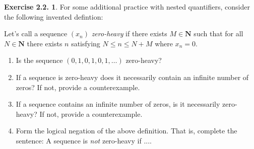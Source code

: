 \documentclass[12pt]{article}
\theoremstyle{definition}
\theoremstyle{exercise}
\newtheorem{exercise}{Exercise 2.2.}
\theoremstyle{solution}
\newcommand{\N}{\mathbf{N}}
\begin{document}
\begin{exercise}
\label{ex:8}
    For some additional practice with nested quantifiers, consider the following invented defintion:

    Let's call a sequence \( (x_n) \) \textit{zero-heavy} if there exists \( M \in \N \) such that for all \( N \in \N \) there exists \( n \) satisfying \( N \leq n \leq N + M \) where \( x_n = 0 \).
    \begin{enumerate}
        \item Is the sequence \( (0, 1, 0, 1, 0, 1, \ldots) \) zero-heavy?

        \item If a sequence is zero-heavy does it necessarily contain an infinite number of zeros? If not, provide a counterexample.

        \item If a sequence contains an infinite number of zeros, is it necessarily zero-heavy? If not, provide a counterexample.

        \item Form the logical negation of the above definition. That is, complete the sentence: A sequence is \textit{not} zero-heavy if ....
    \end{enumerate}
\end{exercise}
\end{document}
